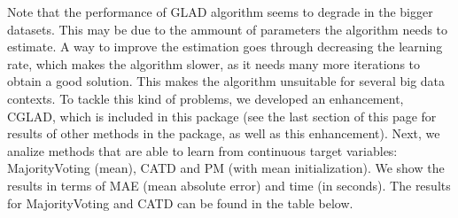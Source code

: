 \documentclass[letterpaper,10pt,english]{sphinxmanual}
\begin{document}
Note that the performance of GLAD algorithm seems to degrade in the bigger datasets. 
This may be due to the ammount of parameters the algorithm needs to estimate. 
A way to improve the estimation goes through decreasing the learning rate, which
makes the algorithm slower, as it needs many more iterations to obtain a good solution. 
This makes the algorithm
unsuitable for several big data contexts.  To tackle this kind of problems, we developed an enhancement, CGLAD,
which is included in this package (see the last section of this page for results of other
methods in the package, as well as this enhancement).
Next, we analize methods that are able to learn from continuous target variables: MajorityVoting (mean), CATD and PM (with mean initialization). We show the results in terms of MAE (mean absolute error) and time (in seconds). The
results for MajorityVoting and CATD can be found in the table below.
\end{document}

